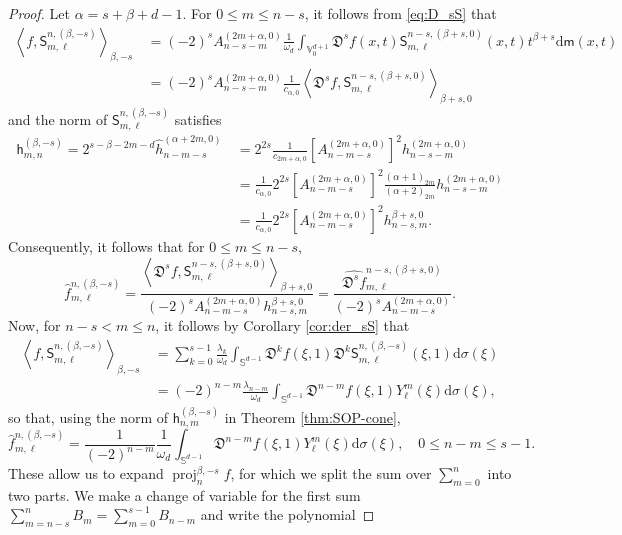 \documentclass[10pt,a4paper]{amsart}
\def\VV{{\mathbb V}}
\def\a{{\alpha}}
\def\b{{\beta}}
\def\d{\mathrm{d}}
\def\fD{{\mathfrak D}}
\def\l{{\lambda}}
\def\o{{\omega}}
\def\proj{\operatorname{proj}}
\def\s{\sigma}
\def\sS{{\mathsf S}}
\def\sh{{\mathsf h}}
\def\sm{{\mathsf m}}
\def\sph{{\mathbb{S}^{d-1}}}
\newcommand{\wh}{\widehat}
\begin{document}
\begin{proof}
Let $\a = s+\b+d-1$. For $0 \le m \le n-s$, it follows from \eqref{eq:D_sS} that
\begin{align*}
\left \langle f,  \sS_{m, \ell}^{n,(\b,-s)}\right \rangle_{\b,-s} \,&  =(-2)^s A_{n-s-m}^{(2m+\a,0)}
   \frac{1}{\o_d} \int_{\VV_0^{d+1}} \fD^s f(x,t) \sS_{m,\ell}^{n-s,(\b+s,0)}(x,t) t^{\b+s} \d \sm(x,t)\\
         & = (-2)^s A_{n-s-m}^{(2m+\a,0)} \frac{1}{c_{\a,0}}
           \left \langle \fD^s f,  \sS_{m, \ell}^{n-s,(\b+s,0)}\right \rangle_{\b+s,0}
\end{align*}
and the norm of $\sS_{m,\ell}^{n,(\b,-s)}$ satisfies
\begin{align*}
  \sh_{m,n}^{(\b,-s)} = 2^{s - \b-2m-d} \wh h_{n-m-s}^{(\a+2m,0)} \, & =
   2^{2s}  \frac{1}{c_{2m+\a,0}} \left[A_{n-m-s}^{(2m+\a,0)}\right]^2 h_{n-s-m}^{(2m+\a,0)} \\
  & = \frac{1}{c_{\a,0}} 2^{2s} \left[A_{n-m-s}^{(2m+\a,0)}\right]^2 \frac{(\a+1)_{2m}}{(\a+2)_{2m}}h_{n-s-m}^{(2m+\a,0)}\\
  & =  \frac{1}{c_{\a,0}} 2^{2s} \left[A_{n-m-s}^{(2m+\a,0)}\right]^2 h_{n-s, m}^{\b+s,0}.
\end{align*}
Consequently, it follows that for $0 \le m \le n-s$,
\begin{equation}\label{eq:FourierCoeffs}
 \hat f_{m,\ell}^{n, (\b,-s)} = \frac{ \left \langle \fD^s f,  \sS_{m, \ell}^{n-s,(\b+s,0)}\right \rangle_{\b+s,0}}
       { (-2)^{s} A_{n-m-s}^{(2m+\a,0)} h_{n-s, m}^{\b+s,0}}
        = \frac{ \wh{\fD^s f}_{m,\ell}^{n-s, (\b+s,0)}}{(-2)^{s} A_{n-m-s}^{(2m+\a,0)}}.
\end{equation}
Now, for $n-s < m \le n$, it follows by Corollary \ref{cor:der_sS} that
\begin{align*}
\left \langle f, \sS_{m, \ell}^{n,(\b,-s)}\right \rangle_{\b,-s}
\,& = \sum_{k=0}^{s-1} \frac{\l_k}{\o_d} \int_{\sph} \fD^k f(\xi,1) \fD^k  \sS_{m, \ell}^{n,(\b,-s)}(\xi,1)\d \s(\xi) \\
 & = (-2)^{n-m} \frac{\l_{n-m}}{\o_d} \int_{\sph}\fD^{n-m} f(\xi,1) Y_\ell^{m} (\xi)\d \s(\xi),
\end{align*}
so that, using the norm of $\sh_{n,m}^{(\b,-s)}$ in Theorem \ref{thm:SOP-cone},
$$
\hat f_{m,\ell}^{n, (\b,-s)} = \frac{1}{(-2)^{n-m}} \frac{1}{\o_d} \int_{\sph} \fD^{n-m} f(\xi,1) Y_\ell^{m} (\xi)\d \s(\xi),
   \quad 0\le n-m \le s-1.
$$
These allow us to expand $\proj_n^{\b,-s} f$, for which we split the sum over $\sum_{m=0}^n$ into two parts. We make 
a change of variable for the first sum $\sum_{m=n-s}^n B_m = \sum_{m=0}^{s-1} B_{n-m}$ and write the polynomial 

\end{proof}
\end{document}

